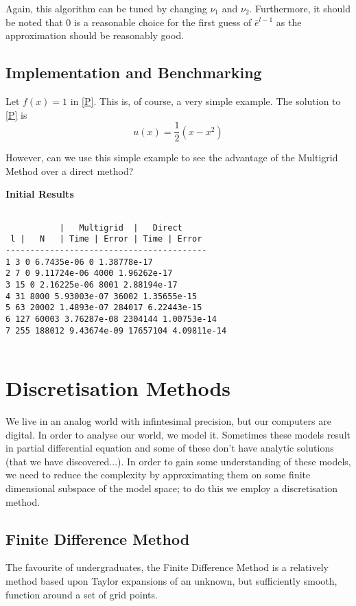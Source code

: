 \documentclass[a4paper,10pt,oneside]{book}
\theoremstyle{plain}%
\theoremstyle{definition}
\theoremstyle{remark}
\begin{document}
Again, this algorithm can be tuned by changing $\nu_1$ and $\nu_2$.
Furthermore, it should be noted that $0$ is a reasonable choice for the first
guess of $\bar{e}^{l-1}$ as the approximation should be reasonably good.

\section{Implementation and Benchmarking}

Let $f(x)=1$ in \eqref{P}. This is, of course, a very simple example. The
solution to \eqref{P} is
\begin{equation}
 u(x)=\frac{1}{2}(x-x^2)
\end{equation}

However, can we use this simple example to see the advantage of the Multigrid
Method over a direct method?

\textbf{Initial Results}
\begin{verbatim}

           |   Multigrid  |   Direct     
 l |   N   | Time | Error | Time | Error 
-----------------------------------------
1 3 0 6.7435e-06 0 1.38778e-17
2 7 0 9.11724e-06 4000 1.96262e-17
3 15 0 2.16225e-06 8001 2.88194e-17
4 31 8000 5.93003e-07 36002 1.35655e-15
5 63 20002 1.4893e-07 284017 6.22443e-15
6 127 60003 3.76287e-08 2304144 1.00753e-14
7 255 188012 9.43674e-09 17657104 4.09811e-14
 
\end{verbatim}

\chapter{Discretisation Methods}
\label{chap:discretisation_methods}
We live in an analog world with infintesimal precision, but our computers are
digital. In order to analyse our world, we model it. Sometimes these models
result in partial differential equation and some of these don't have analytic
solutions (that we have discovered...). In order to gain some understanding of
these models, we need to reduce the complexity by approximating them on some
finite dimensional subspace of the model space; to do this we employ a
discretisation method.

\section{Finite Difference Method}
The favourite of undergraduates, the Finite Difference Method is a relatively
method based upon Taylor expansions of an unknown, but sufficiently smooth,
function around a set of grid points.
\end{document}
